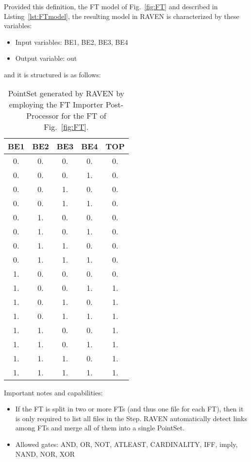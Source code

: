 Provided this definition, the FT model of Fig.~\ref{fig:FT} and described in Listing~\ref{lst:FTmodel}, 
the resulting model in RAVEN is characterized by these variables:
\begin{itemize}
	\item Input variables: BE1, BE2, BE3, BE4
	\item Output variable: out
\end{itemize}
and it is structured is as follows:

\begin{table}
    \centering
    \caption{PointSet generated by RAVEN by employing the FT Importer Post-Processor for the FT of Fig.~\ref{fig:FT}.}
	\begin{tabular}{c | c | c | c | c} 
		\hline 
		BE1 & BE2 & BE3 & BE4 & TOP \\ 
		\hline 
		 0. &  0. &  0. &  0. &  0. \\
		 0. &  0. &  0. &  1. &  0. \\
		 0. &  0. &  1. &  0. &  0. \\
		 0. &  0. &  1. &  1. &  0. \\
		 0. &  1. &  0. &  0. &  0. \\
		 0. &  1. &  0. &  1. &  0. \\
		 0. &  1. &  1. &  0. &  0. \\
		 0. &  1. &  1. &  1. &  0. \\
		 1. &  0. &  0. &  0. &  0. \\
		 1. &  0. &  0. &  1. &  1. \\
		 1. &  0. &  1. &  0. &  1. \\
		 1. &  0. &  1. &  1. &  1. \\
		 1. &  1. &  0. &  0. &  1. \\
		 1. &  1. &  0. &  1. &  1. \\
		 1. &  1. &  1. &  0. &  1. \\
		 1. &  1. &  1. &  1. &  1. \\
		\hline 
	\end{tabular}
\end{table}

Important notes and capabilities:
\begin{itemize}
	\item If the FT is split in two or more FTs (and thus one file for each FT), then it is only required to list 
	      all files in the Step. RAVEN automatically detect links among FTs and merge all of them into a single PointSet.
	\item Allowed gates: AND, OR, NOT, ATLEAST, CARDINALITY, IFF, imply, NAND, NOR, XOR
\end{itemize}

